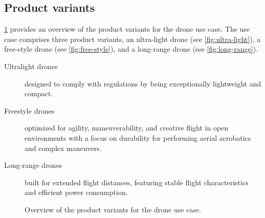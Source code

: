 \documentclass[sigconf,review]{acmart}
\begin{document}
\subsection{Product variants}
\label{sec:product-variants}

\cref{fig:product-variants} provides an overview of the product variants for the drone use case.
The use case comprises three product variants, an ultra-light drone (see \cref{fig:ultra-light}), a free-style drone (see \cref{fig:free-style}), and a long-range drone (see \cref{fig:long-range}).

\begin{description}
    \item[Ultralight drones] designed to comply with regulations by being exceptionally lightweight and compact.
    \item[Freestyle drones] optimized for agility, maneuverability, and creative flight in open environments with a focus on durability for performing aerial acrobatics and complex maneuvers.
    \item[Long-range drones] built for extended flight distances, featuring stable flight characteristics and efficient power consumption.
\end{description}

\begin{figure}[htbp]
    \hfill
    \hfill
    \caption{Overview of the product variants for the drone use case.}
    \label{fig:product-variants}
\end{figure}
\end{document}
